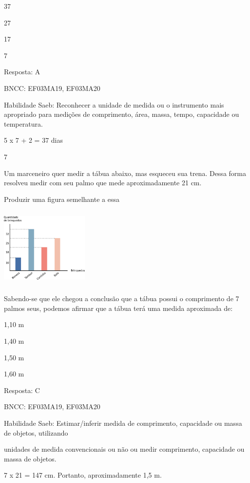 \begin{escolha}
{\begin{escolha}
{\begin{escolha}
\item
  37
\item
  27
\item
  17
\item
  7
\end{escolha}

Resposta: A

BNCC: EF03MA19, EF03MA20

Habilidade Saeb: Reconhecer a unidade de medida ou o instrumento mais
apropriado para medições de comprimento, área, massa, tempo, capacidade
ou temperatura.

5 x 7 + 2 = 37 dias

\num{7}

Um marceneiro quer medir a tábua abaixo, mas esqueceu sua trena. Dessa
forma resolveu medir com seu palmo que mede aproximadamente 21 cm.

Produzir uma figura semelhante a essa

\includegraphics[width=1.73077in,height=1.57654in]{media/image119.png}

Sabendo-se que ele chegou a conclusão que a tábua possui o comprimento
de 7 palmos seus, podemos afirmar que a tábua terá uma medida aproximada
de:

\begin{escolha}
\item
  1,10 m
\item
  1,40 m
\item
  1,50 m
\item
  1,60 m
\end{escolha}

Resposta: C

BNCC: EF03MA19, EF03MA20

Habilidade Saeb: Estimar/inferir medida de comprimento, capacidade ou
massa de objetos, utilizando

unidades de medida convencionais ou não ou medir comprimento, capacidade
ou massa de objetos.

7 x 21 = 147 cm. Portanto, aproximadamente 1,5 m.

}
\end{escolha}}
\end{escolha}
